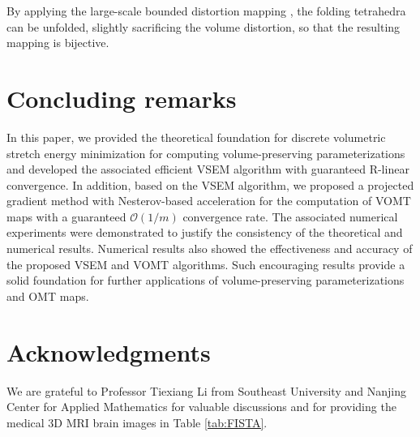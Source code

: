 \documentclass[onefignum,onetabnum]{siamonline220329}
\numberwithin{equation}{section}
\begin{document}
\begin{sloppypar}
\begin{remark}
By applying the large-scale bounded distortion mapping \cite{KoAB15,LargeScaleBD}, the folding tetrahedra can be unfolded, slightly sacrificing the volume distortion, so that the resulting mapping is bijective. 
\end{remark}


\section{Concluding remarks}
\label{sec:7}

In this paper, we provided the theoretical foundation for discrete volumetric stretch energy minimization for computing volume-preserving parameterizations and developed the associated efficient VSEM algorithm with guaranteed R-linear convergence.
In addition, based on the VSEM algorithm, we proposed a projected gradient method with Nesterov-based acceleration for the computation of VOMT maps with a guaranteed $\mathcal{O}(1/m)$ convergence rate.
The associated numerical experiments were demonstrated to justify the consistency of the theoretical and numerical results.
Numerical results also showed the effectiveness and accuracy of the proposed VSEM and VOMT algorithms. Such encouraging results provide a solid foundation for further applications of volume-preserving parameterizations and OMT maps.

\section*{Acknowledgments}
We are grateful to Professor Tiexiang Li from Southeast University and Nanjing Center for Applied Mathematics for valuable discussions and for providing the medical 3D MRI brain images in Table \ref{tab:FISTA}.




\end{sloppypar}
\end{document}
